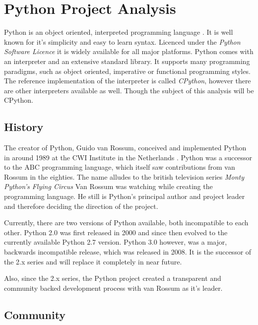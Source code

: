 \section{Python Project Analysis} %


Python is an object oriented, interpreted programming language
\cite{PythonAbout}. It is well known for it's simplicity and easy to learn
syntax. Licenced under the \emph{Python Software Licence} \cite{PythonLicence}
it is widely available for all major platforms. Python comes with an
interpreter and an extensive standard library. It supports many programming
paradigms, such as object oriented, imperative or functional programming
styles. The reference implementation of the interpreter is called
\emph{CPython}, however there are other interpreters available as well. Though
the subject of this analysis will be CPython.

\subsection{History} %

The creator of Python, Guido van Rossum, conceived and implemented Python in
around 1989 at the CWI Institute in the Netherlands \cite{Venners2003}. Python
was a successor to the ABC programming language, which itself saw contributions
from van Rossum in the eighties. The name alludes to the british television
series \emph{Monty Python's Flying Circus} Van Rossum was watching while
creating the programming language. He still is Python's principal author and
project leader and therefore deciding the direction of the project.

Currently, there are two versions of Python available, both incompatible to
each other. Python 2.0 was first released in 2000 and since then evolved to the
currently available Python 2.7 version. Python 3.0 however, was a major,
backwards incompatible release, which was released in 2008. It is the successor
of the 2.x series and will replace it completely in near future.

Also, since the 2.x series, the Python project created a transparent and
community backed development process with van Rossum as it's leader.


\subsection{Community} %

